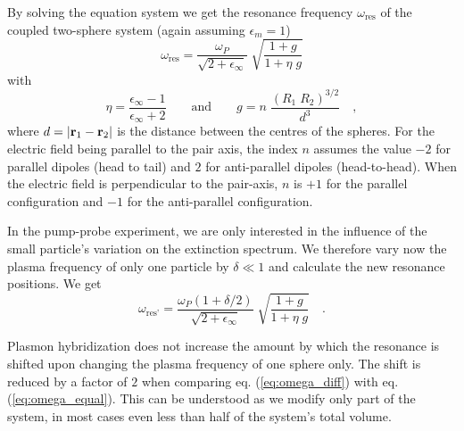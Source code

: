 By solving the equation system \label{eq:equationsystem} we  get the resonance
frequency $\omega_{\text{res}} $ of the coupled two-sphere system (again assuming $\epsilon_m
= 1$)
%
\begin{equation}  \label{eq:omega_coupled}
 \omega_{\text{res}} = \frac{\omega_P}{\sqrt{2 + \epsilon_{\infty}} }  \; \sqrt{
\frac{1 + g}{ 1 +  \eta \; g}}
\end{equation}
%
with 
%
\begin{equation} \label{eq:omega_coupled_variables}
 \eta = \frac{\epsilon_{\infty} - 1}{\epsilon_{\infty} + 2 } 
 \qquad \text{and} \qquad
    g = n \; \frac{\left(R_1 \; R_2 \right)^{3/2}}{d^3}   \quad ,
\end{equation}
%
where $d = \left| {\bf r}_1 -  {\bf r}_2 \right|$ is the distance between the
centres of the spheres.
For the electric field being parallel to the pair axis, the index $n$ assumes
the value $-2$ for parallel dipoles (head to tail) and $2$ for anti-parallel
dipoles (head-to-head). When the electric field is perpendicular to the
pair-axis, $n$ is $+1$ for the parallel configuration and $-1$ for the
anti-parallel configuration.

In the pump-probe experiment, we are only interested in the influence of the
small particle's variation on the extinction spectrum. We therefore vary now the
plasma frequency of only one particle by $\delta \ll 1$ and calculate the new
resonance positions. We get
%
\begin{equation} \label{eq:omega_diff}
 \omega_{\text{res'}} = \frac{\omega_P (1 + \delta / 2)}{\sqrt{2 + \epsilon_{\infty}} }
 \; \sqrt{ \frac{1 + g}{ 1 +  \eta \; g}} \quad .
\end{equation}

Plasmon hybridization does not increase the amount by which the resonance is
shifted upon changing the plasma frequency of one sphere only. The shift is reduced by a factor of $2$ when comparing 
 eq. (\ref{eq:omega_diff})  with  eq.
(\ref{eq:omega_equal}). This can be understood
as we modify only part of the system,  in most cases even less than half of the
system's total volume.



